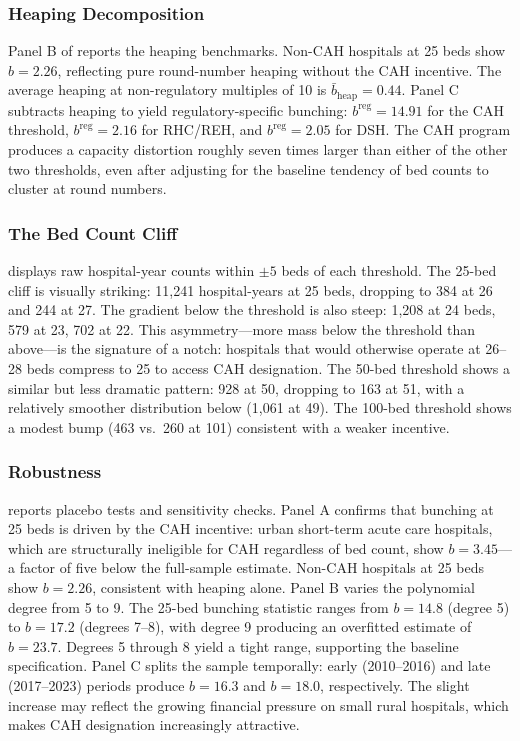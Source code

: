 \documentclass[12pt]{article}
\begin{document}
\subsubsection*{Heaping Decomposition} Panel B of  reports the heaping benchmarks. Non-CAH hospitals at 25 beds show $b = 2.26$, reflecting pure round-number heaping without the CAH incentive. The average heaping at non-regulatory multiples of 10 is $\bar{b}_{\text{heap}} = 0.44$. Panel C subtracts heaping to yield regulatory-specific bunching: $b^{\text{reg}} = 14.91$ for the CAH threshold, $b^{\text{reg}} = 2.16$ for RHC/REH, and $b^{\text{reg}} = 2.05$ for DSH. The CAH program produces a capacity distortion roughly seven times larger than either of the other two thresholds, even after adjusting for the baseline tendency of bed counts to cluster at round numbers.



\subsubsection*{The Bed Count Cliff}  displays raw hospital-year counts within $\pm 5$ beds of each threshold. The 25-bed cliff is visually striking: 11,241 hospital-years at 25 beds, dropping to 384 at 26 and 244 at 27. The gradient below the threshold is also steep: 1,208 at 24 beds, 579 at 23, 702 at 22. This asymmetry---more mass below the threshold than above---is the signature of a notch: hospitals that would otherwise operate at 26--28 beds compress to 25 to access CAH designation. The 50-bed threshold shows a similar but less dramatic pattern: 928 at 50, dropping to 163 at 51, with a relatively smoother distribution below (1,061 at 49). The 100-bed threshold shows a modest bump (463 vs.\ 260 at 101) consistent with a weaker incentive.



\subsubsection*{Robustness}  reports placebo tests and sensitivity checks. Panel A confirms that bunching at 25 beds is driven by the CAH incentive: urban short-term acute care hospitals, which are structurally ineligible for CAH regardless of bed count, show $b = 3.45$---a factor of five below the full-sample estimate. Non-CAH hospitals at 25 beds show $b = 2.26$, consistent with heaping alone. Panel B varies the polynomial degree from 5 to 9. The 25-bed bunching statistic ranges from $b = 14.8$ (degree 5) to $b = 17.2$ (degrees 7--8), with degree 9 producing an overfitted estimate of $b = 23.7$. Degrees 5 through 8 yield a tight range, supporting the baseline specification. Panel C splits the sample temporally: early (2010--2016) and late (2017--2023) periods produce $b = 16.3$ and $b = 18.0$, respectively. The slight increase may reflect the growing financial pressure on small rural hospitals, which makes CAH designation increasingly attractive.
\end{document}
